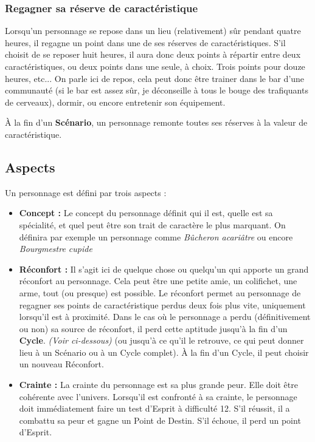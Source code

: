 \subsubsection*{Regagner sa réserve de caractéristique}

Lorsqu'un personnage se repose dans un lieu (relativement) sûr pendant quatre heures, il regagne un point dans une de ses réserves de caractéristiques. S'il choisit de se reposer huit heures, il aura donc deux points à répartir entre deux caractéristiques, ou deux points dans une seule, à choix. Trois points pour douze heures, etc... On parle ici de repos, cela peut donc être trainer dans le bar d'une communauté (si le bar est assez sûr, je déconseille à tous le bouge des trafiquants de cerveaux), dormir, ou encore entretenir son équipement.

À la fin d'un \textbf{Scénario}, un personnage remonte toutes ses réserves à la valeur de caractéristique.

\subsection{Aspects}

Un personnage est défini par trois aspects :

\begin{itemize}
	\item \textbf{Concept :} Le concept du personnage définit qui il est, quelle est sa spécialité, et quel peut être son trait de caractère le plus marquant. On définira par exemple un personnage comme \emph{Bûcheron acariâtre} ou encore \emph{Bourgmestre cupide}
	\item \textbf{Réconfort :} Il s'agit ici de quelque chose ou quelqu'un qui apporte un grand réconfort au personnage. Cela peut être une petite amie, un colifichet, une arme, tout (ou presque) est possible. Le réconfort permet au personnage de regagner ses points de caractéristique perdus deux fois plus vite, uniquement lorsqu'il est à proximité. Dans le cas où le personnage a perdu (définitivement ou non) sa source de réconfort, il perd cette aptitude jusqu'à la fin d'un \textbf{Cycle}. \emph{(Voir ci-dessous)} (ou jusqu'à ce qu'il le retrouve, ce qui peut donner lieu à un Scénario ou à un Cycle complet). À la fin d'un Cycle, il peut choisir un nouveau Réconfort.
	\item \textbf{Crainte :} La crainte du personnage est sa plus grande peur. Elle doit être cohérente avec l'univers. Lorsqu'il est confronté à sa crainte, le personnage doit immédiatement faire un test d'Esprit à difficulté 12. S'il réussit, il a combattu sa peur et gagne un Point de Destin. S'il échoue, il perd un point d'Esprit.
\end{itemize}


